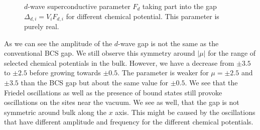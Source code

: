 \documentclass[..\main.tex]{subfile}
\begin{document}
\begin{figure}[H]
    
    \caption{$d$-wave superconductive parameter $F_d$ taking part into the gap $\Delta_{d,i} = V_i F_{d,i}$ for different chemical potential. This parameter is purely 
    real.}
\end{figure}
As we can see the amplitude of the $d$-wave gap is not the same as the conventional BCS gap. We still observe this symmetry around $|\mu|$ for the range of selected chemical potentials in the bulk.
However, we have a decrease from $\pm3.5$ to $\pm2.5$ before growing towards $\pm0.5$. The parameter is weaker for $\mu=\pm2.5$ and $\pm3.5$ than the BCS gap but
about the same value for $\pm0.5$. We see that the Friedel oscillations as well as the presence of bound states still provoke oscillations on the sites near the vacuum.
We see as well, that the gap is not symmetric around bulk along the $x$ axis. This might be caused by the oscillations that have different amplitude and frequency
for the different chemical potentials.\\



\end{document}
